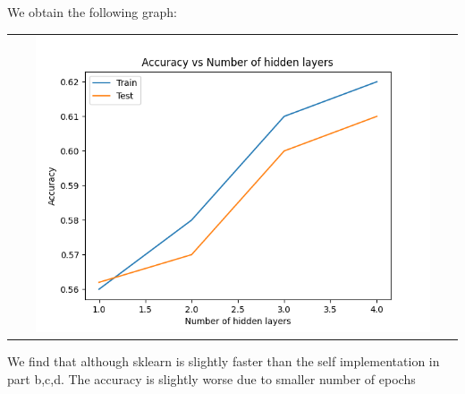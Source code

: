 \begin{enumerate}[label=(\alph*)]
\begin{enumerate}[label=\roman*.]
    \end{enumerate}
    We obtain the following graph:
    \begin{center}
        \begin{tabular}{c}
            \includegraphics[width=0.9\textwidth]{../Q2/Graphs/part_f.png}
        \end{tabular}
    \end{center}
    We find that although sklearn is slightly faster than the self implementation in part b,c,d. The accuracy is slightly worse due to smaller number of epochs

\end{enumerate}


